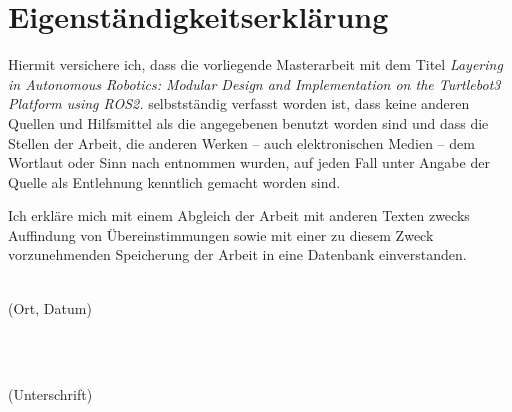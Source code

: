 \chapter*{Eigenständigkeitserklärung}
Hiermit versichere ich, dass die vorliegende Masterarbeit mit dem Titel \textit{Layering in Autonomous Robotics: Modular Design and Implementation on the Turtlebot3 Platform using ROS2. } selbstständig verfasst worden ist, dass keine anderen Quellen und Hilfsmittel als die angegebenen benutzt worden sind und dass die Stellen der Arbeit, die anderen Werken -- auch elektronischen Medien -- dem Wortlaut oder Sinn nach entnommen wurden, auf jeden Fall unter Angabe der Quelle als Entlehnung kenntlich gemacht worden sind.

Ich erkläre mich mit einem Abgleich der Arbeit mit anderen Texten zwecks Auffindung von Übereinstimmungen sowie mit einer zu diesem Zweck vorzunehmenden Speicherung der Arbeit in eine Datenbank einverstanden.


\vspace*{2cm}

\begin{minipage}{0.5\textwidth}
  \begin{flushleft} \large
    \underline{\hspace{6cm}} \\
    {\footnotesize (Ort, Datum)}
  \end{flushleft}
\end{minipage}
~
\begin{minipage}{0.5\textwidth}
  \begin{flushright} \large
    \underline{\hspace{6cm}} \\
    {\footnotesize (Unterschrift)}
  \end{flushright}
\end{minipage}\\[0.5cm]